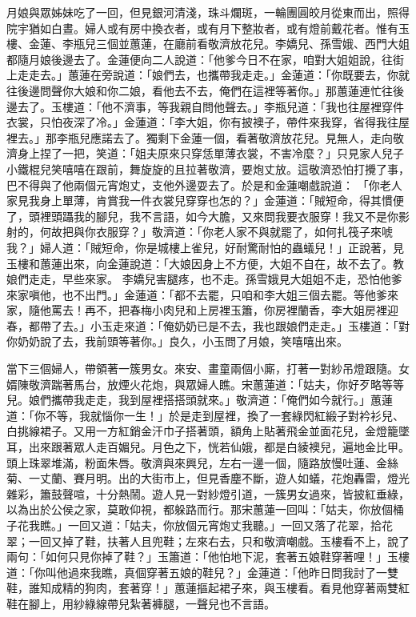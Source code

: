 \begin{showcontents}{}
月娘與眾姊妹吃了一回，但見銀河清淺，珠斗爛斑，一輪團圓皎月從東而出，照得院宇猶如白晝。婦人或有房中換衣者，或有月下整妝者，或有燈前戴花者。惟有玉樓、金蓮、李瓶兒三個並蕙蓮，在廳前看敬濟放花兒。李嬌兒、孫雪娥、西門大姐都隨月娘後邊去了。金蓮便向二人說道：「他爹今日不在家，咱對大姐姐說，往街上走走去。」蕙蓮在旁說道：「娘們去，也攜帶我走走。」金蓮道：「你既要去，你就往後邊問聲你大娘和你二娘，看他去不去，俺們在這裡等著你。」那蕙蓮連忙往後邊去了。玉樓道：「他不濟事，等我親自問他聲去。」李瓶兒道：「我也往屋裡穿件衣裳，只怕夜深了冷。」金蓮道：「李大姐，你有披襖子，帶件來我穿，省得我往屋裡去。」那李瓶兒應諾去了。獨剩下金蓮一個，看著敬濟放花兒。見無人，走向敬濟身上捏了一把，笑道：「姐夫原來只穿恁單薄衣裳，不害冷麼？」只見家人兒子小鐵棍兒笑嘻嘻在跟前，舞旋旋的且拉著敬濟，要炮丈放。這敬濟恐怕打攪了事，巴不得與了他兩個元宵炮丈，支他外邊耍去了。於是和金蓮嘲戲說道： 「你老人家見我身上單薄，肯賞我一件衣裳兒穿穿也怎的？」金蓮道：「賊短命，得其慣便了，頭裡頭躡我的腳兒，我不言語，如今大膽，又來問我要衣服穿！我又不是你影射的，何故把與你衣服穿？」敬濟道：「你老人家不與就罷了，如何扎筏子來唬我？」婦人道：「賊短命，你是城樓上雀兒，好耐驚耐怕的蟲蟻兒！」正說著，見玉樓和蕙蓮出來，向金蓮說道：「大娘因身上不方便，大姐不自在，故不去了。教娘們走走，早些來家。
李嬌兒害腿疼，也不走。孫雪娥見大姐姐不走，恐怕他爹來家嗔他，也不出門。」金蓮道：「都不去罷，只咱和李大姐三個去罷。等他爹來家，隨他罵去！再不，把春梅小肉兒和上房裡玉簫，你房裡蘭香，李大姐房裡迎春，都帶了去。」小玉走來道：「俺奶奶已是不去，我也跟娘們走走。」玉樓道：「對你奶奶說了去，我前頭等著你。」良久，小玉問了月娘，笑嘻嘻出來。

當下三個婦人，帶領著一簇男女。來安、畫童兩個小廝，打著一對紗吊燈跟隨。女婿陳敬濟踹著馬台，放煙火花炮，與眾婦人瞧。宋蕙蓮道：「姑夫，你好歹略等等兒。娘們攜帶我走走，我到屋裡搭搭頭就來。」敬濟道：「俺們如今就行。」蕙蓮道：「你不等，我就惱你一生！」於是走到屋裡，換了一套綠閃紅緞子對衿衫兒、白挑線裙子。又用一方紅銷金汗巾子搭著頭，額角上貼著飛金並面花兒，金燈籠墜耳，出來跟著眾人走百媚兒。月色之下，恍若仙娥，都是白綾襖兒，遍地金比甲。頭上珠翠堆滿，粉面朱唇。敬濟與來興兒，左右一邊一個，隨路放慢吐蓮、金絲菊、一丈蘭、賽月明。出的大街市上，但見香塵不斷，遊人如蟻，花炮轟雷，燈光雜彩，簫鼓聲喧，十分熱鬧。遊人見一對紗燈引道，一簇男女過來，皆披紅垂綠，以為出於公侯之家，莫敢仰視，都躲路而行。那宋蕙蓮一回叫：「姑夫，你放個桶子花我瞧。」一回又道：「姑夫，你放個元宵炮丈我聽。」一回又落了花翠，拾花翠；一回又掉了鞋，扶著人且兜鞋；左來右去，只和敬濟嘲戲。玉樓看不上，說了兩句：「如何只見你掉了鞋？」玉簫道：「他怕地下泥，套著五娘鞋穿著哩！」玉樓道：「你叫他過來我瞧，真個穿著五娘的鞋兒？」金蓮道：「他昨日問我討了一雙鞋，誰知成精的狗肉，套著穿！」蕙蓮摳起裙子來，與玉樓看。看見他穿著兩雙紅鞋在腳上，用紗綠線帶兒紮著褲腿，一聲兒也不言語。


\end{showcontents}
